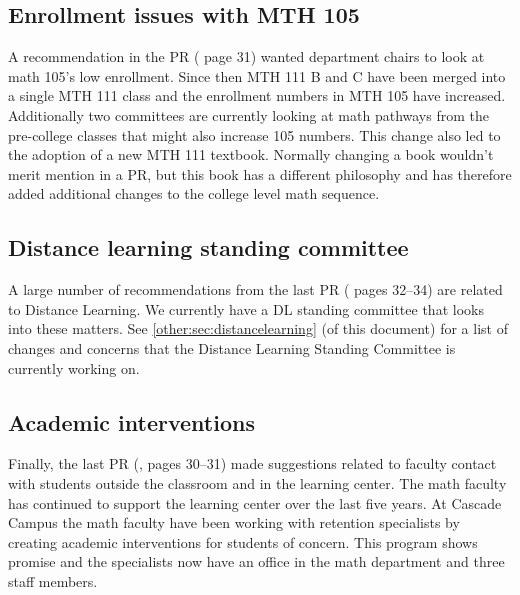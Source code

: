 \subsection{Enrollment issues with MTH 105}
A recommendation in the PR (\cite{mathprogramreview2003} page 31) wanted
department chairs to look at math
105's low enrollment. Since then MTH 111 B and C have been merged into a single
MTH 111 class and the enrollment numbers in MTH 105 have increased.
Additionally two committees are
currently looking at math pathways from the pre-college classes that might also
increase 105 numbers.  This change also led to the adoption of a new MTH 111
textbook.  Normally changing a book wouldn't merit mention in a PR, but this book
has a different philosophy and has therefore added additional changes to the
college level math sequence.

\subsection{Distance learning standing committee}
A large number of recommendations from the last PR (\cite{mathprogramreview2003}
pages 32--34) are related to
Distance Learning. We currently have a DL standing committee that looks into
these matters.  See \vref{other:sec:distancelearning} (of this document) for a
list of changes and concerns
that the Distance Learning Standing Committee is currently working on.

\subsection{Academic interventions}
Finally, the last PR (\cite{mathprogramreview2003}, pages 30--31) made
suggestions related to faculty contact with
students outside the classroom and in the learning center.  The math faculty has
continued to support the learning center over the last five years.  At Cascade
Campus the math faculty have been working with retention specialists by creating
academic interventions for students of concern.  This program shows promise and
the specialists now have an office in the math department and three staff members.
